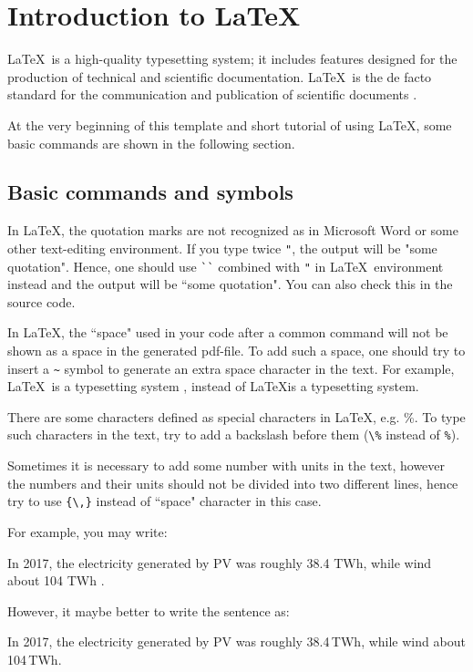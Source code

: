 \chapter{Introduction to \LaTeX}

\graphicspath{ {graphics/Chapter1/} }

\LaTeX~is a high-quality typesetting system; it includes features designed for the production of technical and scientific documentation. \LaTeX~is the de facto standard for the communication and publication of scientific documents \cite{LaTeX3Team.}.

At the very beginning of this template and short tutorial of using \LaTeX, some basic commands are shown in the following section.

\section{Basic commands and symbols}
	
	In \LaTeX, the quotation marks are not recognized as in Microsoft Word or some other text-editing environment. If you type twice {\verb|"|}, the output will be "some quotation". Hence, one should use {\verb|``|} combined with {\verb|"|} in \LaTeX~environment instead and the output will be ``some quotation". You can also check this in the source code.
	
	In \LaTeX, the ``space" used in your code after a common command will not be shown as a space in the generated pdf-file. To add such a space, one should try to insert a {\verb|~|} symbol to generate an extra space character in the text. For example, \LaTeX~is a typesetting system , instead of \LaTeX is a typesetting system.
	
	There are some characters defined as special characters in \LaTeX, e.g. \%. To type such characters in the text, try to add a backslash before them ({\verb|\%|} instead of {\verb|%|}).
	
	Sometimes it is necessary to add some number with units in the text, however the numbers and their units should not be divided into two different lines, hence try to use {\verb|{\,}|} instead of ``space" character in this case.
	
	For example, you may write:
	
	In 2017, the electricity generated by \acrshort{PV} was roughly 38.4 TWh, while wind about 104 TWh \cite{Burger.20180508}.
	
	However, it maybe better to write the sentence as:
	
	In 2017, the electricity generated by \acrshort{PV} was roughly 38.4{\,}TWh, while wind about 104{\,}TWh.
	
	
